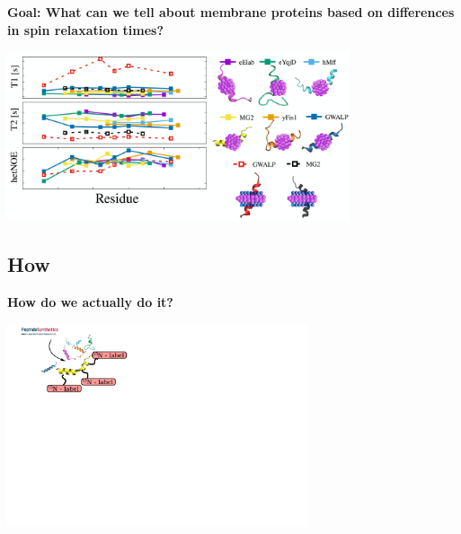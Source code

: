 \documentclass{beamer}
\begin{document}
\addtocounter{framenumber}{-1}
\begin{frame}
\begin{center}
\Large{\centering
\textbf{Goal: What can we tell about membrane proteins based on differences in spin relaxation times?} \\}

\vspace{0.5cm}

\includegraphics[height=5cm]{can_we.pdf}
\end{center}
\end{frame}



\subsection{How}

\begin{frame}
\begin{center}
\Large{\centering
\textbf{How do we actually do it?} \\}

\vspace{0.5cm}

\includegraphics[height=6cm]{what_we_do11.pdf}
\end{center}
\end{frame}
\end{document}
